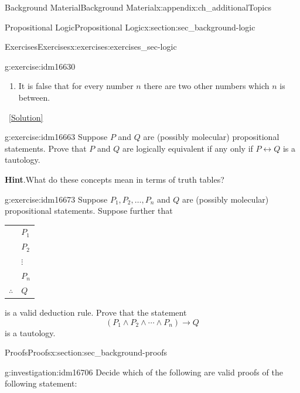 \documentclass[oneside,10pt,]{book}
\numberwithin{equation}{chapter}
\newcommand{\hrulethin}  {\noalign{\hrule height 0.04em}}
\def\iff{\leftrightarrow}
\def\imp{\rightarrow}
\begin{document}
\begin{appendixptx}{Background Material}{}{Background Material}{}{}{x:appendix:ch_additionalTopics}
\begin{sectionptx}{Propositional Logic}{}{Propositional Logic}{}{}{x:section:sec_background-logic}
\begin{exercises-subsection}{Exercises}{}{Exercises}{}{}{x:exercises:exercises_sec-logic}
\begin{divisionexercise}{14}{}{}{g:exercise:idm16630}
\begin{enumerate}[label=(\alph*)]
\item{}It is false that for every number \(n\) there are two other numbers which \(n\) is between.%
\end{enumerate}
%
\qquad~\hfill{\tiny\hyperlink{g:solution:idm16649-main}{[Solution]}}\end{divisionexercise}%
\begin{divisionexercise}{15}{}{}{g:exercise:idm16663}%
Suppose \(P\) and \(Q\) are (possibly molecular) propositional statements.  Prove that \(P\) and \(Q\) are logically equivalent if any only if \(P \iff Q\) is a tautology.%
\par\smallskip%
\noindent\textbf{Hint}.\hypertarget{g:hint:idm16671}{}\quad{}What do these concepts mean in terms of truth tables?%
\end{divisionexercise}%
\begin{divisionexercise}{16}{}{}{g:exercise:idm16673}%
Suppose \(P_1, P_2, \ldots, P_n\) and \(Q\) are (possibly molecular) propositional statements.  Suppose further that%
\begin{sidebyside}{1}{0}{0}{0}%
\begin{sbspanel}{1}%
{\centering%
\begin{tabular}{ll}
&\(P_1\)\tabularnewline[0pt]
&\(P_2\)\tabularnewline[0pt]
&\(\vdots\)\tabularnewline[0pt]
&\(P_n\)\tabularnewline\hrulethin
\(\therefore\)&\(Q\)
\end{tabular}
\par}
\end{sbspanel}%
\end{sidebyside}%
\par
is a valid deduction rule.  Prove that the statement%
\begin{equation*}
(P_1 \wedge P_2 \wedge \cdots \wedge P_n) \imp Q
\end{equation*}
is a tautology.%
\end{divisionexercise}%
\end{exercises-subsection}
\end{sectionptx}
%
%
\typeout{************************************************}
\typeout{************************************************}
%
\begin{sectionptx}{Proofs}{}{Proofs}{}{}{x:section:sec_background-proofs}
\begin{introduction}{}%
\begin{investigation}{}{g:investigation:idm16706}%
Decide which of the following are valid proofs of the following statement:%
\begin{quote}%

\end{quote}
\end{investigation}
\end{introduction}
\end{sectionptx}
\end{appendixptx}
\end{document}

